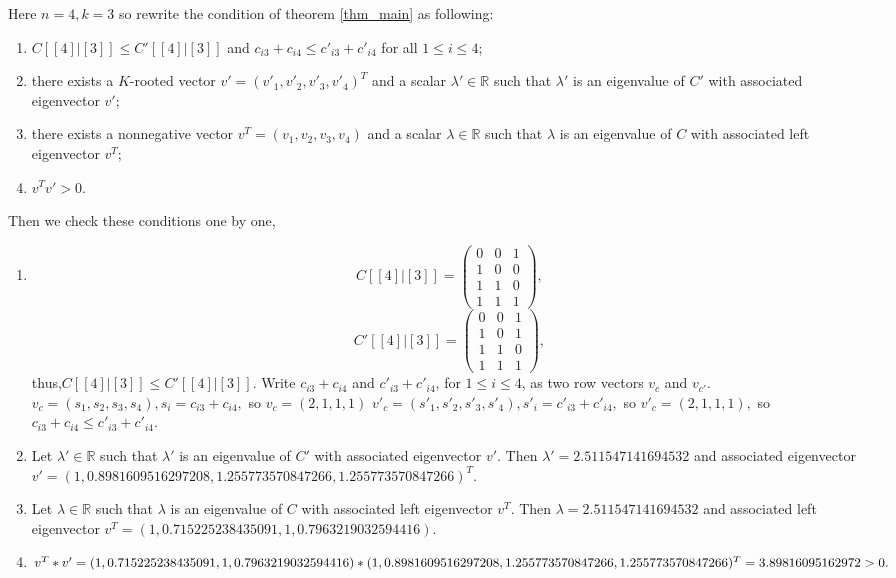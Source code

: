 \documentclass[12pt, a4paper]{article}
\theoremstyle{plain}
\theoremstyle{definition}
\begin{document}
    Here $n=4,k=3$ so rewrite the condition of theorem \ref{thm_main} as following:
    \begin{enumerate}[label=(\roman*)]
        \item  $C[[4]|[3]]\leq C'[[4]|[3]]$ and $c_{i3}+c_{i4}\leq c'_{i3}+c'_{i4}$ for all $1\leq i\leq 4$;
        \item  there exists a $K$-rooted vector $v'=(v'_1, v'_2, v'_3, v'_4)^T$ and a scalar $\lambda'\in \mathbb{R}$
        such that $\lambda'$ is an eigenvalue of $C'$ with associated eigenvector $v'$;
        \item there exists a nonnegative vector $v^T=(v_1, v_2, v_3, v_4)$ and a scalar $\lambda\in \mathbb{R}$ 
        such that $\lambda$ is an eigenvalue of $C$ with associated left eigenvector $v^T$;
        \item $v^Tv'>0.$
    \end{enumerate}
    Then we check these conditions one by one,
    \begin{enumerate}[label=(\roman*)]
    \item 
    $$C[[4]|[3]]=\begin{pmatrix}
        0 & 0 & 1\\
        1 & 0 & 0\\
        1 & 1 & 0\\
        1 & 1 & 1
        \end{pmatrix},$$
    $$C'[[4]|[3]]=\begin{pmatrix}
        0 & 0 & 1\\
        1 & 0 & 1\\
        1 & 1 & 0\\
        1 & 1 & 1
        \end{pmatrix},$$
    thus,$C[[4]|[3]]\leq C'[[4]|[3]].$
    Write $c_{i3}+c_{i4}$ and $c'_{i3}+c'_{i4}$, for $1\leq i\leq 4$, as two row vectors $v_c$ and $v_{c'}$.
    $v_c = (s_1, s_2, s_3, s_4), s_i = c_{i3}+c_{i4},$ so $v_c = (2,1,1,1)$
    $v'_c = (s'_1, s'_2, s'_3, s'_4), s'_i = c'_{i3}+c'_{i4},$ so $v'_c = (2,1,1,1),$
    so $c_{i3}+c_{i4} \leq c'_{i3}+c'_{i4}.$
    \item 
    Let $\lambda'\in \mathbb{R}$ such that $\lambda'$ is an eigenvalue of $C'$ with associated eigenvector $v'$.
    Then $\lambda' = 2.511547141694532$ and associated eigenvector $v'=(1, 0.8981609516297208, 1.255773570847266, 1.255773570847266)^T$.
    \item 
    Let  $\lambda\in \mathbb{R}$ such that $\lambda$ is an eigenvalue of $C$ with associated left eigenvector $v^T$.
    Then $\lambda = 2.511547141694532$ and associated left eigenvector $v^T=(1, 0.715225238435091, 1, 0.7963219032594416)$.
    \item 
    $v^T * v' = (1, 0.715225238435091, 1, 0.7963219032594416) \\
    * (1, 0.8981609516297208, 1.255773570847266, 1.255773570847266)^T
    \\ = 3.89816095162972 >0.$

    \end{enumerate}
    
\end{document}
